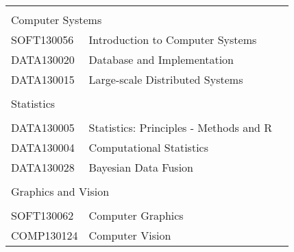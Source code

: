 \begin{table}[]
\begin{tabular}{lll}
             &                                                    &  \\
\multicolumn{2}{l}{Computer Systems}                              &  \\
SOFT130056   & Introduction to Computer Systems                   &  \\
DATA130020   & Database and Implementation                        &  \\
DATA130015   & Large-scale Distributed Systems                    &  \\
             &                                                    &  \\
\multicolumn{2}{l}{Statistics}                                    &  \\
             &                                                    &  \\
DATA130005   & Statistics: Principles - Methods and R             &  \\
DATA130004   & Computational Statistics                           &  \\
DATA130028   & Bayesian Data Fusion                               &  \\
             &                                                    &  \\
\multicolumn{2}{l}{Graphics and Vision}                           &  \\
             &                                                    &  \\
SOFT130062   & Computer Graphics                                  &  \\
COMP130124   & Computer Vision                                    &  \\
\end{tabular}
\end{table}
